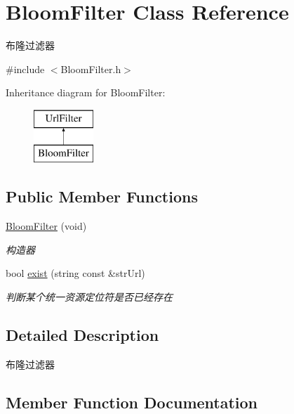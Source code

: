 \hypertarget{class_bloom_filter}{}\section{Bloom\+Filter Class Reference}
\label{class_bloom_filter}


布隆过滤器  




{\ttfamily \#include $<$Bloom\+Filter.\+h$>$}

Inheritance diagram for Bloom\+Filter\+:\begin{figure}[H]
\begin{center}
\leavevmode
\includegraphics[height=2.000000cm]{class_bloom_filter}
\end{center}
\end{figure}
\subsection*{Public Member Functions}
\begin{DoxyCompactItemize}
\item 
\mbox{\label{class_bloom_filter_a4e78efdfb6b1a240ab58d9f1cdea3c48}} 
\hyperlink{class_bloom_filter_a4e78efdfb6b1a240ab58d9f1cdea3c48}{Bloom\+Filter} (void)
\begin{DoxyCompactList}\small\item\em 构造器 \end{DoxyCompactList}\item 
bool \hyperlink{class_bloom_filter_a78a992167b8efbc3be672469e68c5e97}{exist} (string const \&str\+Url)
\begin{DoxyCompactList}\small\item\em 判断某个统一资源定位符是否已经存在 \end{DoxyCompactList}\end{DoxyCompactItemize}


\subsection{Detailed Description}
布隆过滤器 

\subsection{Member Function Documentation}
\mbox{\label{class_bloom_filter_a78a992167b8efbc3be672469e68c5e97}} 
